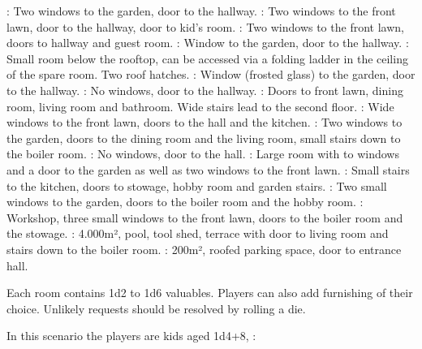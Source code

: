 {		: Two windows to the garden, door to the hallway. : Two windows to the front lawn, door to the hallway, door to kid's room. : Two windows to the front lawn, doors to hallway and guest room. : Window to the garden, door to the hallway. : Small room below the rooftop, can be accessed via a folding ladder in the ceiling of the spare room. Two roof hatches. : Window (frosted glass) to the garden, door to the hallway. : No windows, door to the hallway. : Doors to front lawn, dining room, living room and bathroom. Wide stairs lead to the second floor. : Wide windows to the front lawn, doors to the hall and the kitchen. : Two windows to the garden, doors to the dining room and the living room, small stairs down to the boiler room. : No windows, door to the hall. : Large room with to windows and a door to the garden as well as two windows to the front lawn. :	Small stairs to the kitchen, doors to stowage, hobby room and garden stairs. : Two small windows to the garden, doors to the boiler room and the hobby room. : Workshop, three small windows to the front lawn, doors to the boiler room and the stowage. : 4.000m², pool, tool shed, terrace with door to living room and stairs down to the boiler room. : 200m², roofed parking space, door to entrance hall.

		Each room contains 1d2 to 1d6 valuables. Players can also add furnishing of their choice. Unlikely requests should be resolved by rolling a die.


		\noindent
		In this scenario the players are kids aged 1d4+8, \eg:


}

